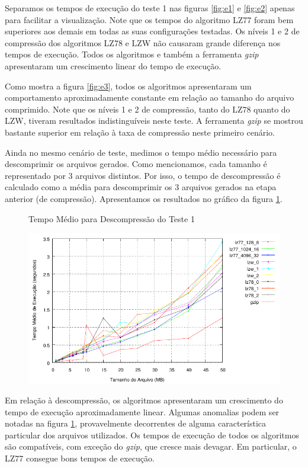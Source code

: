 \documentclass[]{article}
\newcommand{\figref}[1]{figura \ref{#1}}
\begin{document}
Separamos os tempos de execução do teste 1 nas figuras \ref{fig:e1} e \ref{fig:e2} apenas para facilitar a visualização. Note que os tempos do algoritmo LZ77 foram bem superiores aos demais em todas as suas configurações testadas. Os níveis 1 e 2 de compressão dos algoritmos LZ78 e LZW não causaram grande diferença nos tempos de execução. Todos os algoritmos e também a ferramenta \textit{gzip} apresentaram um crescimento linear do tempo de execução.

Como mostra a \figref{fig:e3}, todos os algoritmos apresentaram um comportamento aproximadamente constante em relação ao tamanho do arquivo comprimido. Note que os níveis 1 e 2 de compressão, tanto do LZ78 quanto do LZW, tiveram resultados indistinguíveis neste teste. A ferramenta \textit{gzip} se mostrou bastante superior em relação à taxa de compressão neste primeiro cenário.

Ainda no mesmo cenário de teste, medimos o tempo médio necessário para descomprimir os arquivos gerados. Como mencionamos, cada tamanho é representado por 3 arquivos distintos. Por isso, o tempo de descompressão é calculado como a média para descomprimir os 3 arquivos gerados na etapa anterior (de compressão). Apresentamos os resultados no gráfico da \figref{fig:e4}.

\begin{figure}
	{\centering Tempo Médio para Descompressão do Teste 1\par}
	\includegraphics{images/natural_descompressao}
\caption{}
\label{fig:e4}
\end{figure}

Em relação à descompressão, os algoritmos apresentaram um crescimento do tempo de execução aproximadamente linear. Algumas anomalias podem ser notadas na \figref{fig:e4}, provavelmente decorrentes de alguma característica particular dos arquivos utilizados. Os tempos de execução de todos os algoritmos são compatíveis, com exceção do \textit{gzip}, que cresce mais devagar. Em particular, o LZ77 consegue bons tempos de execução.
\end{document}

